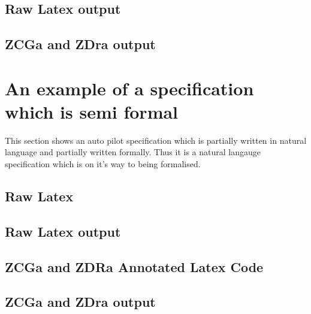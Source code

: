 %
\subsection{Raw Latex output}

%
\subsection{ZCGa and ZDra output}


\section{An example of a specification which is semi formal}
This section shows an auto pilot specification which is partially written in natural language and partially written formally. Thus it is a natural langauge specification which is on it's way to being formalised.

\subsection{Raw Latex}

\subsection{Raw Latex output}

\subsection{ZCGa and ZDRa Annotated Latex Code}

\subsection{ZCGa and ZDra output}


